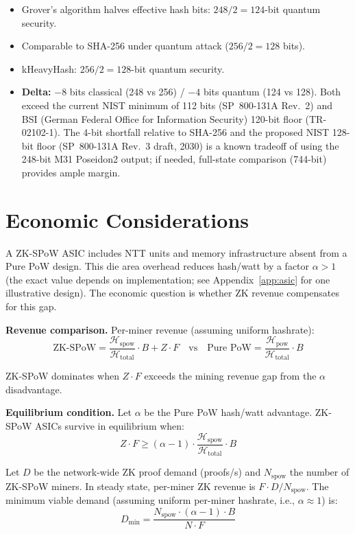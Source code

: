 \documentclass[11pt,a4paper]{article}
\begin{document}
\begin{itemize}
\item Grover's algorithm halves effective hash bits: $248/2 = 124$-bit quantum security.
\item Comparable to SHA-256 under quantum attack ($256/2 = 128$ bits).
\item kHeavyHash: $256/2 = 128$-bit quantum security.
\item \textbf{Delta:} $-8$ bits classical (248 vs 256) / $-4$ bits quantum (124 vs 128). Both exceed the current NIST minimum of 112 bits (SP~800-131A Rev.~2) and BSI (German Federal Office for Information Security) 120-bit floor (TR-02102-1). The 4-bit shortfall relative to SHA-256 and the proposed NIST 128-bit floor (SP~800-131A Rev.~3 draft, 2030) is a known tradeoff of using the 248-bit M31 Poseidon2 output; if needed, full-state comparison (744-bit) provides ample margin.
\end{itemize}

\section{Economic Considerations}
\label{sec:econ}

A ZK-SPoW ASIC includes NTT units and memory infrastructure absent from a Pure PoW design. This die area overhead reduces hash/watt by a factor $\alpha > 1$ (the exact value depends on implementation; see Appendix~\ref{app:asic} for one illustrative design). The economic question is whether ZK revenue compensates for this gap.

\textbf{Revenue comparison.} Per-miner revenue (assuming uniform hashrate):
$$\text{ZK-SPoW} = \frac{\mathcal{H}_{\mathrm{spow}}}{\mathcal{H}_{\mathrm{total}}} \cdot B + Z \cdot F \quad \text{vs} \quad \text{Pure PoW} = \frac{\mathcal{H}_{\mathrm{pow}}}{\mathcal{H}_{\mathrm{total}}} \cdot B$$

ZK-SPoW dominates when $Z \cdot F$ exceeds the mining revenue gap from the $\alpha$ disadvantage.

\textbf{Equilibrium condition.} Let $\alpha$ be the Pure PoW hash/watt advantage. ZK-SPoW ASICs survive in equilibrium when:
$$Z \cdot F \geq (\alpha - 1) \cdot \frac{\mathcal{H}_{\mathrm{spow}}}{\mathcal{H}_{\mathrm{total}}} \cdot B$$

Let $D$ be the network-wide ZK proof demand (proofs/s) and $N_{\mathrm{spow}}$ the number of ZK-SPoW miners. In steady state, per-miner ZK revenue is $F \cdot D / N_{\mathrm{spow}}$. The minimum viable demand (assuming uniform per-miner hashrate, i.e., $\alpha \approx 1$) is:
$$D_{\min} = \frac{N_{\mathrm{spow}} \cdot (\alpha - 1) \cdot B}{N \cdot F}$$
\end{document}
